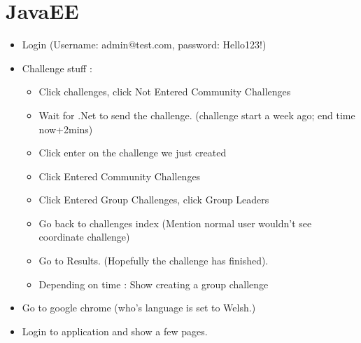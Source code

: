 \documentclass[10pt,a4paper]{report}
\begin{document}
\section*{JavaEE}
\begin{itemize}
\item Login (Username: admin@test.com, password: Hello123!)
\item Challenge stuff :
\begin{itemize}
\item Click challenges, click Not Entered Community Challenges
\item Wait for .Net to send the challenge. (challenge start a week ago; end time now+2mins)
\item Click enter on the challenge we just created
\item Click Entered Community Challenges
\item Click Entered Group Challenges, click Group Leaders
\item Go back to challenges index (Mention normal user wouldn't see coordinate challenge)
\item Go to Results. (Hopefully the challenge has finished).
\item Depending on time : Show creating a group challenge
\end{itemize}
\item Go to google chrome (who's language is set to Welsh.)
\item Login to application and show a few pages.
\end{itemize}
\end{document}
